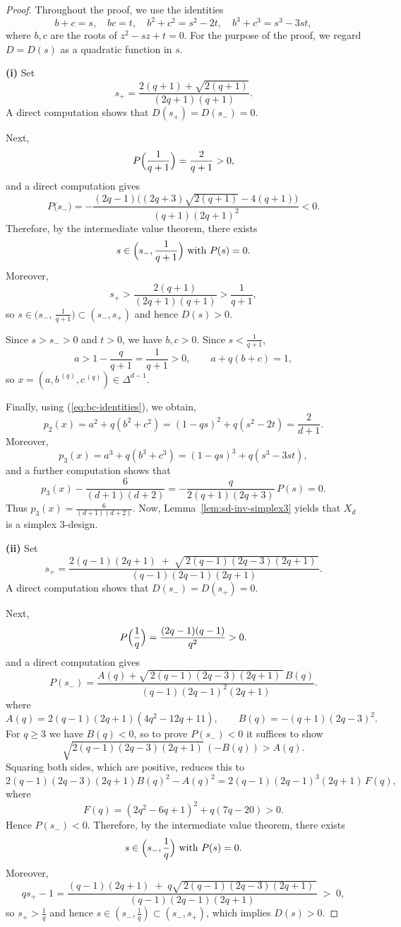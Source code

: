 \documentclass{amsart}
\theoremstyle{definition}
\theoremstyle{remark}
\numberwithin{equation}{section}
\begin{document}
\begin{proof}
Throughout the proof, we use the identities
\begin{equation}\label{eq:bc-identities}
b+c=s,\quad bc=t,\quad b^2+c^2=s^2-2t,\quad b^3+c^3=s^3-3st,
\end{equation}
where $b,c$ are the roots of $z^2-sz+t=0$.
For the purpose of the proof, we regard $D=D(s)$ as a quadratic function in $s$.

\textbf{(i)}
Set
\[
s_+=\frac{2(q+1)+\sqrt{2(q+1)}}{(2q+1)(q+1)}.
\]
A direct computation shows that $D(s_+)=D(s_-)=0$.

Next,
\[
P\Bigl(\frac1{q+1}\Bigr)=\frac{2}{q+1}>0,
\]
and a direct computation gives
\[
P\bigl(s_-\bigr)
=
-\frac{(2q-1)\bigl((2q+3)\sqrt{2(q+1)}-4(q+1)\bigr)}{(q+1)(2q+1)^2}<0.
\]
Therefore, by the intermediate value theorem, there exists
\[
s\in\Bigl(s_-,\frac1{q+1}\Bigr)\ \text{with}\ P(s)=0.
\]
Moreover,
\[
s_+>\frac{2(q+1)}{(2q+1)(q+1)}
>\frac1{q+1},
\]
so $s\in\bigl(s_-,\,\frac1{q+1}\bigr)\subset (s_-,s_+)$ and hence $D(s)>0$.

Since $s>s_->0$ and $t>0$, we have $b,c>0$.
Since $s<\frac1{q+1}$,
\[
a>1-\frac{q}{q+1}=\frac1{q+1}>0,\qquad
a+q(b+c)=1,
\]
so $x=(a,b^{\,(q)},c^{\,(q)})\in\Delta^{d-1}$.

Finally, using (\ref{eq:bc-identities}), we obtain, 
\[
p_2(x)=a^2+q(b^2+c^2)=(1-qs)^2+q(s^2-2t)=\frac{2}{d+1}.
\]
Moreover,
\[
p_3(x)=a^3+q(b^3+c^3)=(1-qs)^3+q(s^3-3st),
\]
and a further computation shows that
\[
p_3(x)-\frac{6}{(d+1)(d+2)}
=
-\frac{q}{2(q+1)(2q+3)}\,P(s)=0.
\]
Thus $p_3(x)=\frac{6}{(d+1)(d+2)}$.
Now, Lemma~\ref{lem:sd-inv-simplex3} yields that $X_d$ is a simplex $3$-design.

\textbf{(ii)}
Set
\[
s_+=\frac{2(q-1)(2q+1)\;+\;\sqrt{\,2(q-1)(2q-3)(2q+1)\,}}{(q-1)(2q-1)(2q+1)}.
\]
A direct computation shows that $D(s_-)=D(s_+)=0$.

Next,
\[
P\Bigl(\frac{1}{q}\Bigr)=\frac{(2q-1)(q-1)}{q^2}>0.
\]
and a direct computation gives
\[
P(s_-)
=\frac{A(q)+\sqrt{\,2(q-1)(2q-3)(2q+1)\,}\,B(q)}{(q-1)(2q-1)^2(2q+1)}.
\]
where
\[
A(q)=2(q-1)(2q+1)(4q^2-12q+11),\qquad
B(q)=-(q+1)(2q-3)^2.
\]
For $q\ge3$ we have $B(q)<0$, so to prove $P(s_-)<0$ it suffices to show
\[
\sqrt{2(q-1)(2q-3)(2q+1)}\,(-B(q))>A(q).
\]
Squaring both sides, which are positive, reduces this to
\[
2(q-1)(2q-3)(2q+1)B(q)^2-A(q)^2
=2(q-1)(2q-1)^3(2q+1)\,F(q),
\]
where
\[
F(q)=(2q^2-6q+1)^2+q(7q-20)>0.
\]
Hence $P(s_-)<0$.
Therefore, by the intermediate value theorem, there exists
\[
s\in\Bigl(s_-,\frac1q\Bigr)\ \text{with}\ P(s)=0.
\]
Moreover,
\[
q s_+-1
=\frac{(q-1)(2q+1)\;+\;q\sqrt{\,2(q-1)(2q-3)(2q+1)\,}}{(q-1)(2q-1)(2q+1)} \;>\;0,
\]
so $s_+>\frac1q$ and hence $s\in(s_-,\frac1q)\subset(s_-,s_+)$, which implies $D(s)>0$.


\end{proof}
\end{document}
